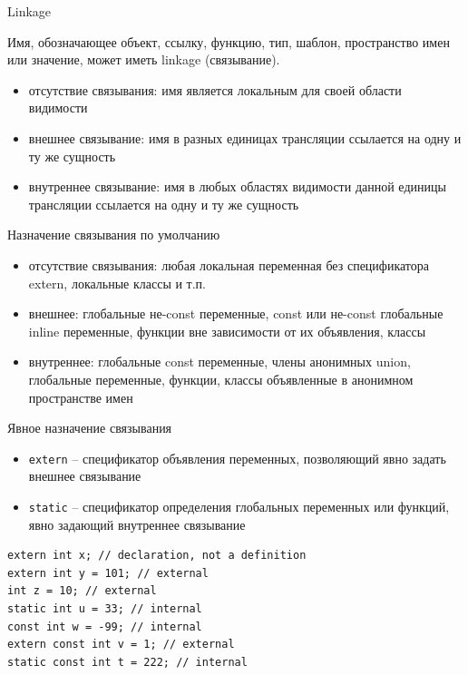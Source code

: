 \documentclass[unknownkeysallowed,xcolor=table]{beamer}
\begin{document}
\begin{frame}{Linkage}

Имя, обозначающее объект, ссылку, функцию, тип, шаблон, пространство имен или значение, может иметь linkage (связывание).

\vspace{0.5em}

\begin{itemize}
  \item отсутствие связывания: имя является локальным для своей области видимости  \vspace{0.5em}
  \item внешнее связывание: имя в разных единицах трансляции ссылается на одну и ту же сущность \vspace{0.5em}
  \item внутреннее связывание: имя в любых областях видимости данной единицы трансляции ссылается на одну и ту же сущность
\end{itemize}

\end{frame}

\begin{frame}{Назначение связывания по умолчанию}

\begin{itemize}
  \item отсутствие связывания: любая локальная переменная без спецификатора extern, локальные классы и т.п. \vspace{1em}
  \item внешнее: глобальные не-const переменные, const или не-const глобальные inline переменные, функции вне зависимости от их объявления, классы \vspace{1em}
  \item внутреннее: глобальные const переменные, члены анонимных union, глобальные переменные, функции, классы объявленные в анонимном пространстве имен
\end{itemize}

\end{frame}

\begin{frame}[fragile]{Явное назначение связывания}

\begin{itemize}
  \item \lstinline{extern} -- спецификатор объявления переменных, позволяющий явно задать внешнее связывание \vspace{0.5em}
  \item \lstinline{static} -- спецификатор определения глобальных переменных или функций, явно задающий внутреннее связывание
\end{itemize}

\begin{lstlisting}
extern int x; // declaration, not a definition
extern int y = 101; // external
int z = 10; // external
static int u = 33; // internal
const int w = -99; // internal
extern const int v = 1; // external
static const int t = 222; // internal
\end{lstlisting}

\end{frame}
\end{document}

